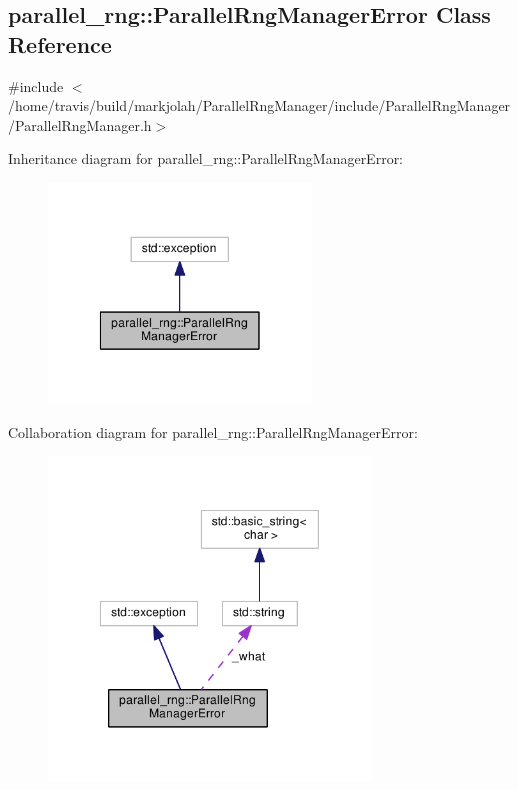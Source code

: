 \hypertarget{classparallel__rng_1_1ParallelRngManagerError}{\subsection{parallel\-\_\-rng\-:\-:Parallel\-Rng\-Manager\-Error Class Reference}
\label{classparallel__rng_1_1ParallelRngManagerError}
}


{\ttfamily \#include $<$/home/travis/build/markjolah/\-Parallel\-Rng\-Manager/include/\-Parallel\-Rng\-Manager/\-Parallel\-Rng\-Manager.\-h$>$}



Inheritance diagram for parallel\-\_\-rng\-:\-:Parallel\-Rng\-Manager\-Error\-:
\nopagebreak
\begin{figure}[H]
\begin{center}
\leavevmode
\includegraphics[width=198pt]{classparallel__rng_1_1ParallelRngManagerError__inherit__graph}
\end{center}
\end{figure}


Collaboration diagram for parallel\-\_\-rng\-:\-:Parallel\-Rng\-Manager\-Error\-:
\nopagebreak
\begin{figure}[H]
\begin{center}
\leavevmode
\includegraphics[width=243pt]{classparallel__rng_1_1ParallelRngManagerError__coll__graph}
\end{center}
\end{figure}
